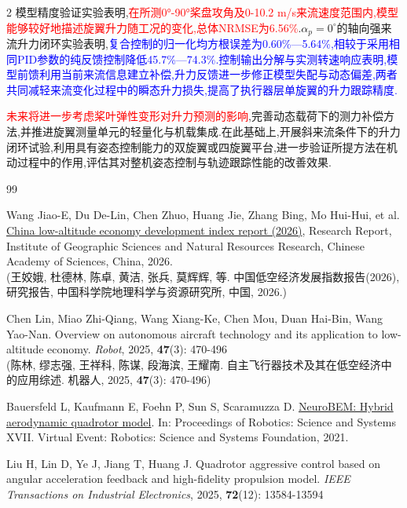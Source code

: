 \documentclass{aas}
\begin{document}
\begin{multicols}{2}
模型精度验证实验表明,\textcolor{red}{在所测0°-90°桨盘攻角及0-10.2 m/s来流速度范围内,模型能够较好地描述旋翼升力随工况的变化,总体NRMSE为6.56\%}.\textcolor{mygreen}{$\alpha_p=0^{\circ}$的轴向强来流升力闭环实验表明},\textcolor{blue}{复合控制的归一化均方根误差为0.60\%—5.64\%,相较于采用相同PID参数的纯反馈控制降低45.7\%—74.3\%.控制输出分解与实测转速响应表明,模型前馈利用当前来流信息建立补偿,升力反馈进一步修正模型失配与动态偏差,两者共同减轻来流变化过程中的瞬态升力损失,提高了执行器层单旋翼的升力跟踪精度.}

\textcolor{red}{未来将进一步考虑桨叶弹性变形对升力预测的影响},完善动态载荷下的测力补偿方法,并推进旋翼测量单元的轻量化与机载集成.在此基础上,开展斜来流条件下的升力闭环试验,利用具有姿态控制能力的双旋翼或四旋翼平台,进一步验证所提方法在机动过程中的作用,评估其对整机姿态控制与轨迹跟踪性能的改善效果.

\begin{thebibliography}{99}
 \addtolength{\itemsep}{0.2em} 

 Wang Jiao-E, Du De-Lin, Chen Zhuo, Huang Jie, Zhang Bing, Mo Hui-Hui, et al. \href{http://www.lrsd.org.cn/sylb/202604/P020260429604572875450.pdf}{China low-altitude economy development index report (2026)}, Research Report, Institute of Geographic Sciences and Natural Resources Research, Chinese Academy of Sciences, China, 2026.\\
(王姣娥, 杜德林, 陈卓, 黄洁, 张兵, 莫辉辉, 等. 中国低空经济发展指数报告(2026), 研究报告, 中国科学院地理科学与资源研究所, 中国, 2026.)

 Chen Lin, Miao Zhi-Qiang, Wang Xiang-Ke, Chen Mou, Duan Hai-Bin, Wang Yao-Nan. Overview on autonomous aircraft technology and its application to low-altitude economy. \textit{Robot}, 2025, \textbf{47}(3): 470-496\\
(陈林, 缪志强, 王祥科, 陈谋, 段海滨, 王耀南. 自主飞行器技术及其在低空经济中的应用综述. 机器人, 2025, \textbf{47}(3): 470-496)

 Bauersfeld L, Kaufmann E, Foehn P, Sun S, Scaramuzza D. \href{https://roboticsproceedings.org/rss17/p042.html}{NeuroBEM: Hybrid aerodynamic quadrotor model}. In: Proceedings of Robotics: Science and Systems XVII. Virtual Event: Robotics: Science and Systems Foundation, 2021.

 Liu H, Lin D, Ye J, Jiang T, Huang J. Quadrotor aggressive control based on angular acceleration feedback and high-fidelity propulsion model. \textit{IEEE Transactions on Industrial Electronics}, 2025, \textbf{72}(12): 13584-13594


\end{thebibliography}
\end{multicols}
\end{document}
